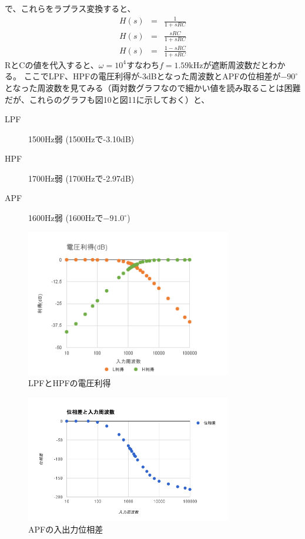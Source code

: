 \documentclass[10pt,a4j,dvipdfmx]{jsarticle}
\begin{document}
で、これらをラプラス変換すると、
\begin{eqnarray}
H\left(s\right) &=& \frac{1}{1+sRC} \\
H\left(s\right) &=& \frac{sRC}{1+sRC} \\
H\left(s\right) &=& \frac{1-sRC}{1+sRC}
\end{eqnarray}
RとCの値を代入すると、$\omega = 10^4$すなわち$f=1.59\si{\kilo\hertz}$が遮断周波数だとわかる。
ここでLPF、HPFの電圧利得が-3dBとなった周波数とAPFの位相差が$−90^{\circ}$となった周波数を見てみる（両対数グラフなので細かい値を読み取ることは困難だが、これらのグラフも図10と図11に示しておく）と、

\begin{description}
 \item[LPF] 1500Hz弱 (1500Hzで-3.10dB)
 \item[HPF] 1700Hz弱 (1700Hzで-2.97dB)
 \item[APF] 1600Hz弱 (1600Hzで$-91.0^{\circ}$)
\end{description}
\begin{figure}[H]
  \centering
  \includegraphics[width=9cm]{ritoku.png}
  \caption{LPFとHPFの電圧利得}
\end{figure}
\begin{figure}[H]
  \centering
  \includegraphics[width=9cm]{isousaApf.png}
  \caption{APFの入出力位相差}
\end{figure}
\end{document}

